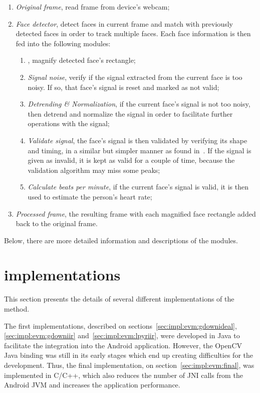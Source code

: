 \begin{enumerate}
  \item \emph{Original frame}, read frame from device's webcam;
  \item \emph{Face detector}, detect faces in current frame and match with
        previously detected faces in order to track multiple faces.
        Each face information is then fed into the following modules:
  \begin{enumerate}
    \item \emph{\evm}, magnify detected face's rectangle;
    \item \emph{Signal noise}, verify if the signal extracted from the
          current face is too noisy. If so, that face's signal is reset
          and marked as not valid;
    \item \emph{Detrending \& Normalization}, if the current face's signal is
          not too noisy, then detrend and normalize the signal in order to
          facilitate further operations with the signal;
    \item \emph{Validate signal}, the face's signal is then validated by
          verifying its shape and timing, in a similar but simpler manner as
          found in~\cite{Nenova2010Automated}. If the signal is given as
          invalid, it is kept as valid for a couple of time, because the
          validation algorithm may miss some peaks;
    \item \emph{Calculate beats per minute}, if the current face's signal is
          valid, it is then used to estimate the person's heart rate;
  \end{enumerate}
  \item \emph{Processed frame}, the resulting frame with each magnified face
        rectangle added back to the original frame.
\end{enumerate}

Below, there are more detailed information and descriptions of the modules.

\section{\evm{} implementations} \label{sec:impl:evm}


This section presents the details of several different implementations of the
\evm{} method.

The first implementations, described on sections~\ref{sec:impl:evm:gdownideal},
\ref{sec:impl:evm:gdowniir} and~\ref{sec:impl:evm:lpyriir},
were developed in Java to facilitate the integration into the Android
application. However, the OpenCV Java binding was still in its early stages
which end up creating difficulties for the development. Thus, the final
implementation, on section~\ref{sec:impl:evm:final}, was implemented in C/C++,
which also reduces the number of JNI calls from the Android JVM and
increases the application performance.

